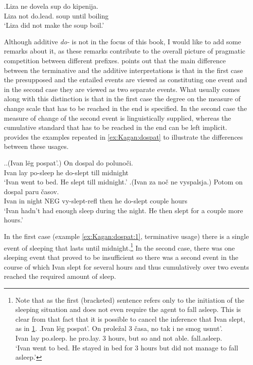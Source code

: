 \exg.\label{ex:do:PP:ne}Liza ne dovela sup do kipenija.\\
Liza not do.lead. soup until boiling\\
\trans `Liza did not make the soup boil.'

Although additive \textit{do-}   is not in the focus of this book, I would like to add some remarks about it, as these remarks contribute to the overall picture of pragmatic competition between different prefixes. \citet[79]{Kagan:book} points out that the main difference between the terminative  and the additive interpretations is that in the first case the presupposed and the entailed events are viewed as constituting one event and in the second case they are viewed as two separate events. What usually comes along with this distinction is that in the first case the degree on the measure of change scale that has to be reached in the end is specified. In the second case the measure of change of the second event is linguistically supplied, whereas the cumulative  standard that has to be reached in the end can be left implicit. \citet[79]{Kagan:book} provides the examples repeated in \ref{ex:Kagan:dospat} to illustrate the differences between these usages.

\ex.\label{ex:Kagan:dospat}\ag.\label{ex:Kagan:dospat:1}(Ivan l\"{e}g pospat'.) On dospal do poluno\v{c}i.\\
Ivan lay po-sleep he do-slept till midnight\\
\trans `Ivan went to bed. He slept till midnight.'
\bg.\label{ex:Kagan:dospat:2}(Ivan za no\v{c} ne vyspalsja.) Potom on dospal paru \v{c}asov.\\
Ivan in night NEG vy-slept-refl then he do-slept couple hours\\
\trans `Ivan hadn't had enough sleep during the night. He then slept for a couple more hours.'

In the first case (example \ref{ex:Kagan:dospat:1}, terminative  usage) there is a single event of sleeping that lasts until midnight.\footnote{Note that as the first (bracketed) sentence refers only to the initiation of the sleeping situation and does not even require the agent to fall asleep. This is clear from that fact that it is possible to cancel the inference that Ivan slept, as in \ref{ex:dospat:no}.
\exg.\label{ex:dospat:no}Ivan l\"{e}g pospat'. On prole\v{z}al 3 \v{c}asa, no tak i ne smog usnut'.\\
Ivan lay po.sleep. he pro.lay. 3 hours, but so and not able. fall.asleep.\\
\trans `Ivan went to bed. He stayed in bed for 3 hours but did not manage to fall asleep.'

} In the second case, there was one sleeping event that proved to be insufficient so there was a second event in the course of which Ivan slept for several hours and thus cumulatively over two events reached the required amount of sleep. 

